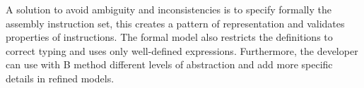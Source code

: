\documentclass[a4paper]{llncs}
\begin{document}
A solution to avoid ambiguity and inconsistencies is to specify
formally the assembly instruction set, this creates a pattern of
representation and validates properties of instructions. The formal
model also restricts the definitions to correct typing and uses only
well-defined expressions. Furthermore, the developer can use with B
method different levels of abstraction and add more specific details
in refined models.

%
%
%
\end{document}
